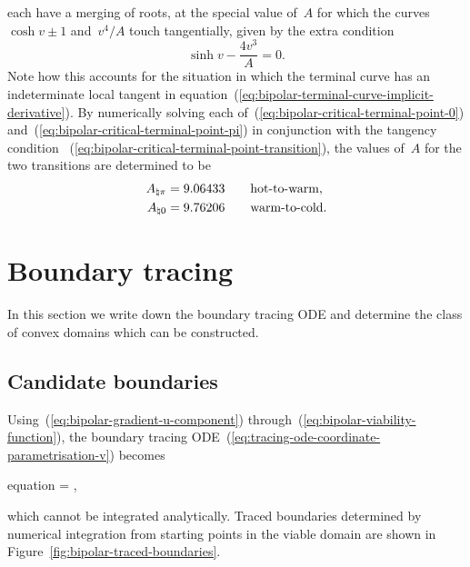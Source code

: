 each have a merging of roots,
at the special value of~$A$
for which the curves~$\cosh v \pm 1$ and~$v^4 / A$
touch tangentially,
given by the extra condition
\begin{equation}
  \sinh v - \frac{4 v^3}{A} = 0.
  \label{eq:bipolar-critical-terminal-point-transition}
\end{equation}
Note how this accounts for the situation in which
the terminal curve has an indeterminate local tangent
in equation~(\ref{eq:bipolar-terminal-curve-implicit-derivative}).
By numerically solving each of~(\ref{eq:bipolar-critical-terminal-point-0})
and~(\ref{eq:bipolar-critical-terminal-point-pi})
in conjunction with the tangency condition~%
  (\ref{eq:bipolar-critical-terminal-point-transition}),
the values of~$A$ for the two transitions are determined to be
\begin{align}
  A_{\natural \pi} &= 9.06433 \qquad \text{hot-to-warm},
    \label{eq:bipolar-transition-a-hot-to-warm}
    \\
  A_{\natural 0} &= 9.76206 \qquad \text{warm-to-cold}.
    \label{eq:bipolar-transition-a-warm-to-cold}
\end{align}

\section{Boundary tracing}
\label{sec:bipolar.tracing}

In this section we write down the boundary tracing ODE
and determine the class of convex domains which can be constructed.

\subsection{Candidate boundaries}
\label{sec:bipolar.tracing.candidates}

Using~(\ref{eq:bipolar-gradient-u-component})
through~(\ref{eq:bipolar-viability-function}),
the boundary tracing ODE~(\ref{eq:tracing-ode-coordinate-parametrisation-v})
becomes
\begin{important}{equation}
   =
    \pm
    ,
  \label{eq:bipolar-tracing-ode-coordinate-parametrisation-v}
\end{important}
which cannot be integrated analytically.
Traced boundaries determined by numerical integration
from starting points in the viable domain
are shown in Figure~\ref{fig:bipolar-traced-boundaries}.

